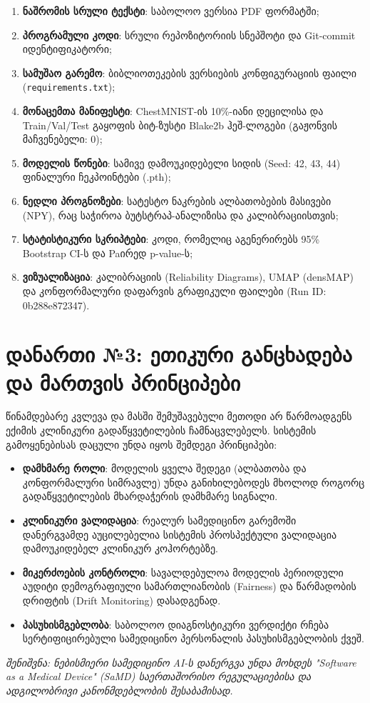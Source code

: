 \documentclass[12pt,a4paper,oneside]{report}
\begin{document}
\begin{enumerate}[leftmargin=1.6em]
    \item \textbf{ნაშრომის სრული ტექსტი}: საბოლოო ვერსია PDF ფორმატში;
    \item \textbf{პროგრამული კოდი}: სრული რეპოზიტორიის სნეპშოტი და Git-commit იდენტიფიკატორი;
    \item \textbf{სამუშაო გარემო}: ბიბლიოთეკების ვერსიების კონფიგურაციის ფაილი (\texttt{requirements.txt});
    \item \textbf{მონაცემთა მანიფესტი}: ChestMNIST-ის 10\%-იანი დეცილისა და Train/Val/Test გაყოფის ბიტ-ზუსტი Blake2b ჰეშ-ლოგები (გაჟონვის მაჩვენებელი: 0);
    \item \textbf{მოდელის წონები}: სამივე დამოუკიდებელი სიდის (Seed: 42, 43, 44) ფინალური ჩეკპოინტები (.pth);
    \item \textbf{ნედლი პროგნოზები}: სატესტო ნაკრების ალბათობების მასივები (NPY), რაც საჭიროა ბუტსტრაპ-ანალიზისა და კალიბრაციისთვის;
    \item \textbf{სტატისტიკური სკრიპტები}: კოდი, რომელიც აგენერირებს 95\% Bootstrap CI-ს და Paირედ p-value-ს;
    \item \textbf{ვიზუალიზაცია}: კალიბრაციის (Reliability Diagrams), UMAP (densMAP) და კონფორმალური დაფარვის გრაფიკული ფაილები (Run ID: 0b288e872347).
\end{enumerate}

\chapter*{დანართი №3: ეთიკური განცხადება და მართვის პრინციპები}
წინამდებარე კვლევა და მასში შემუშავებული მეთოდი არ წარმოადგენს ექიმის კლინიკური გადაწყვეტილების ჩამნაცვლებელს. სისტემის გამოყენებისას დაცული უნდა იყოს შემდეგი პრინციპები:

\begin{itemize}
    \item \textbf{დამხმარე როლი}: მოდელის ყველა შედეგი (ალბათობა და კონფორმალური სიმრავლე) უნდა განიხილებოდეს მხოლოდ როგორც გადაწყვეტილების მხარდაჭერის დამხმარე სიგნალი.
    \item \textbf{კლინიკური ვალიდაცია}: რეალურ სამედიცინო გარემოში დანერგვამდე აუცილებელია სისტემის პროსპექტული ვალიდაცია დამოუკიდებელ კლინიკურ კოჰორტებზე.
    \item \textbf{მიკერძოების კონტროლი}: სავალდებულოა მოდელის პერიოდული აუდიტი დემოგრაფიული სამართლიანობის (Fairness) და წარმადობის დრიფტის (Drift Monitoring) დასადგენად.
    \item \textbf{პასუხისმგებლობა}: საბოლოო დიაგნოსტიკური ვერდიქტი რჩება სერტიფიცირებული სამედიცინო პერსონალის პასუხისმგებლობის ქვეშ.
\end{itemize}
\vspace{1cm}
\noindent \textit{შენიშვნა: ნებისმიერი სამედიცინო AI-ს დანერგვა უნდა მოხდეს "Software as a Medical Device" (SaMD) საერთაშორისო რეგულაციებისა და ადგილობრივი კანონმდებლობის შესაბამისად.}
\end{document}
